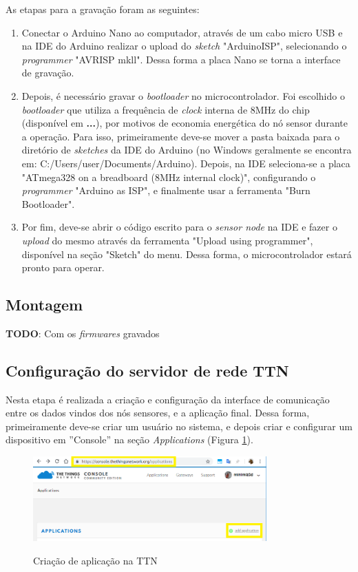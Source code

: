 \documentclass[oneside,openright,12pt]{ufsm_2015} %
\begin{document}
    As etapas para a gravação foram as seguintes:
    \begin{enumerate}
        \item Conectar o Arduino Nano ao computador, através de um cabo micro USB e na IDE do Arduino realizar o upload do \textit{sketch} "ArduinoISP", selecionando o \textit{programmer} "AVRISP mkll". Dessa forma a placa Nano se torna a interface de gravação.
        \item Depois, é necessário gravar o \textit{bootloader} no microcontrolador. Foi escolhido o \textit{bootloader} que utiliza a frequência de \textit{clock} interna de 8MHz do chip (disponível em \textbf{...}), por motivos de economia energética do nó sensor durante a operação. Para isso, primeiramente deve-se mover a pasta baixada para o diretório de \textit{sketches} da IDE do Arduino (no Windows geralmente se encontra em: C:/Users/user/Documents/Arduino). Depois, na IDE seleciona-se a placa "ATmega328 on a breadboard (8MHz internal clock)", configurando o \textit{programmer} "Arduino as ISP", e finalmente usar a ferramenta "Burn Bootloader".
        \item Por fim, deve-se abrir o código escrito para o \textit{sensor node} na IDE e fazer o \textit{upload} do mesmo através da ferramenta "Upload using programmer", disponível na seção "Sketch"  do menu. Dessa forma, o microcontrolador estará pronto para operar.
    \end{enumerate}
    
    \subsection{Montagem}
    \textbf{TODO}: Com os \textit{firmwares} gravados
    
    \subsection{Configuração do servidor de rede TTN}
    Nesta etapa é realizada a criação e configuração da interface de comunicação entre os dados vindos dos nós sensores, e a aplicação final. Dessa forma, primeiramente deve-se criar um usuário no sistema, e depois criar e configurar um dispositivo em ''Console'' na seção \textit{Applications} (Figura \ref{fig:add-app-ttn}). 
    
    \begin{figure}[ht]
 	    \caption{\label{exepretex} Criação de aplicação na TTN}
        \centering
        \includegraphics[width=0.8\textwidth]{figuras/teste.png}
        \vspace{\baselineskip} %
        \label{fig:add-app-ttn}
    \end{figure}
    
\end{document}
